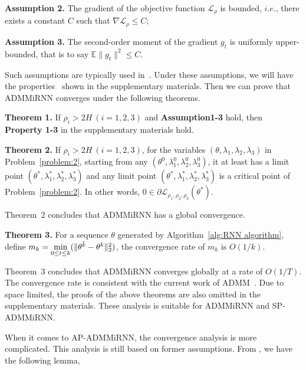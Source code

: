 \documentclass[twoside]{article}
\newtheorem{assumption}{Assumption}
\newtheorem{theorem}{Theorem}
\begin{document}
\begin{multicols}{2}
{\bf Assumption 2.} The gradient of the objective function $\mathcal{L}_\rho$ is bounded, $i.e.$, there exists a constant $C$ such that $\nabla \mathcal{L}_\rho \le C$;

{\bf Assumption 3.} The second-order moment of the gradient $g_t$ is uniformly upper-bounded, that is to say $\mathbb{E}\|g_t\|^2 \le C$.

Such assumptions are typically used in~\cite{Saeed1,Saeed2,zou2019sufficient}.
Under these assumptions, we will have the properties~\cite{wang2019multi} shown in the supplementary materials. Then we can prove that ADMMiRNN converges under the following theorems.

{\bf Theorem 1.} If $\rho_i > 2H~(i=1,2,3)$ and \textbf{Assumption1-3} hold, then \textbf{Property 1-3} in the supplementary materials hold. 

{\bf Theorem 2.} If $\rho_i > 2H~(i=1,2,3)$, for the variables $(\theta, \lambda_1, \lambda_2, \lambda_3)$ in Problem~\ref{problem:2}, starting from any $(\theta^0, \lambda_1^0, \lambda_2^0, \lambda_3^0)$, it at least has a limit point $(\theta^*, \lambda_1^*, \lambda_2^*, \lambda_3^*)$ and any limit point $(\theta^*, \lambda_1^*, \lambda_2^*, \lambda_3^*)$ is a critical point of Problem~\ref{problem:2}. In other words, $0 \in \partial \mathcal{L}_{\rho_1,\rho_2,\rho_3}(\theta^*)$.

Theorem~2 concludes that ADMMiRNN has a global convergence. 

{\bf Theorem 3.} For a sequence $\theta$ generated by Algorithm~\ref{alg:RNN algorithm}, define $m_k=\min\limits_{0\le t \le k}(\|\theta^{\Tilde{k}}-\theta^k\|_2^2)$, the convergence rate of $m_k$ is $O(1/k)$.

Theorem~3 concludes that ADMMiRNN converges globally at a rate of $O(1/T)$. The convergence rate is consistent with the current work of ADMM~\cite{wang2019multi,zhong2014fast,ouyang2013stochastic}. 
Due to space limited, the proofs of the above theorems are also omitted in the supplementary materials.
These analysis is suitable for ADMMiRNN and SP-ADMMiRNN. 

When it comes to AP-ADMMiRNN, the convergence analysis is more complicated. 
This analysis is still based on former assumptions. From \cite{chang2016asynchronous}, we have the following lemma, 


\end{multicols}
\end{document}
